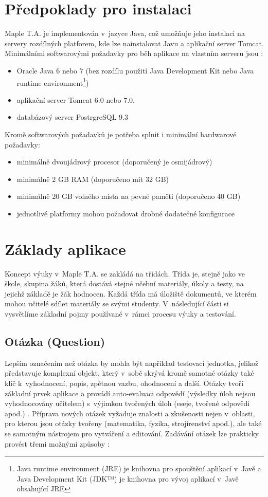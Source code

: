 \documentclass[
print,
  11pt,
  table,   
  nolof,    
  nolot,
  oneside,final
]{fithesis3}
\begin{document}
	\section{Předpoklady pro instalaci}
Maple T.A. je implementován v~jazyce Java, což umožňuje jeho instalaci na servery rozdílných platforem, kde lze nainstalovat Javu a aplikační server Tomcat. Minimálními softwarovými požadavky pro běh aplikace na vlastním serveru jsou \cite{mapletarequirements}:
\begin{itemize}
	\item Oracle Java 6 nebo 7 (bez rozdílu použití Java Development Kit nebo Java runtime environment\footnote{Java runtime environment (JRE) je knihovna pro spouštění aplikací v~Javě a Java Development Kit (JDK™) je knihovna pro vývoj aplikací v~Javě obsahující JRE})
	\item aplikační server Tomcat 6.0 nebo 7.0.
	\item databázový server PostrgreSQL 9.3
\end{itemize}

Kromě softwarových požadavků je potřeba splnit i minimální hardwarové požadavky:
\begin{itemize}
	\item minimálně dvoujádrový procesor (doporučený je osmijádrový)
	\item minimálně 2 GB RAM (doporučeno mít 32 GB)
	\item minimálně 20 GB volného místa na pevné paměti (doporučeno 40 GB)
	\item jednotlivé platformy mohou požadovat drobné dodatečné konfigurace
\end{itemize}
	\section{Základy aplikace}
Koncept výuky v~Maple T.A. se zakládá na třídách. Třída je, stejně jako ve škole, skupina žáků, která dostává stejné učební materiály, úkoly a testy, na jejichž základě je žák hodnocen. Každá třída má úložiště dokumentů, ve kterém mohou učitelé sdílet materiály se svými studenty. V~následující části si vysvětlíme základní pojmy používané v~rámci procesu výuky a testování.
		\subsection{Otázka (Question)}
Lepším označením než otázka by mohla být například testovací jednotka, jelikož představuje komplexní objekt, který v~sobě skrývá kromě samotné otázky také klíč k~vyhodnocení, popis, zpětnou vazbu, ohodnocení a další. Otázky tvoří základní prvek aplikace a provádí auto-evaluaci odpovědí (výsledky úloh nejsou vyhodnocovány učitelem) s~výjimkou tvořených úloh (eseje, tvořené odpovědi apod.) \cite{crompton}. Příprava nových otázek vyžaduje znalosti a zkušenosti nejen v~oblasti, pro kterou jsou otázky tvořeny (matematika, fyzika, strojírenství apod.), ale také se samotným nástrojem pro vytváření a editování. Zadávání otázek lze prakticky provést třemi možnými způsoby \cite{heck2004}:
\end{document}
